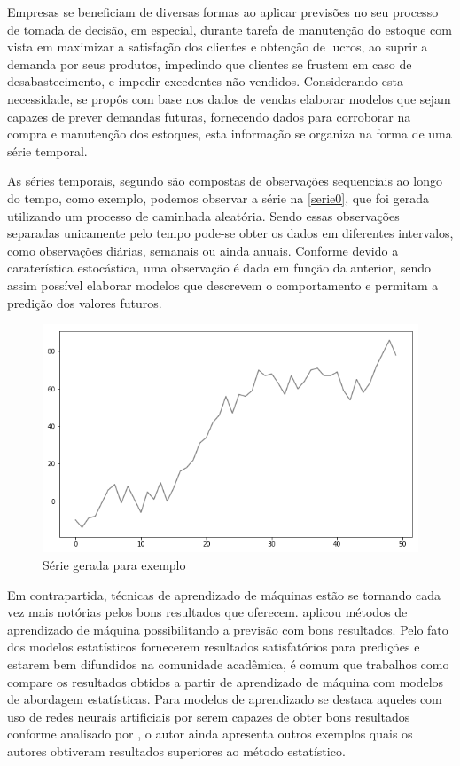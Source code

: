 \documentclass[
    12pt,
    oneside,
    a4paper,
    english,
    brazil
]{abntex2}
\begin{document}
Empresas se beneficiam de diversas formas ao aplicar previsões no seu processo
de tomada de decisão, em especial, durante tarefa de manutenção do estoque com
vista em maximizar a satisfação dos clientes e obtenção de lucros, ao suprir a
demanda por seus produtos, impedindo que clientes se frustem em caso de
desabastecimento, e impedir excedentes não vendidos. Considerando esta
necessidade, se propôs com base nos dados de vendas elaborar modelos que sejam
capazes de prever demandas futuras, fornecendo dados para corroborar na compra e
manutenção dos estoques, esta informação se organiza na forma de uma série
temporal.

As séries temporais, segundo  são compostas de observações
sequenciais ao longo do tempo, como exemplo, podemos observar a série na
\autoref{serie0}, que foi gerada utilizando um processo de caminhada aleatória.
Sendo essas observações separadas unicamente pelo tempo pode-se obter os dados
em diferentes intervalos, como observações diárias, semanais ou ainda anuais.
Conforme  devido a caraterística estocástica, uma observação
é dada em função da anterior, sendo assim possível elaborar modelos que
descrevem o comportamento e permitam a predição dos valores futuros.

\begin{figure}[ht]
    \centering
    \caption{Série gerada para exemplo}\label{serie0}
    \includegraphics[width=.6\linewidth]{images/serie_exemplo.png}
\end{figure}


Em contrapartida, técnicas de aprendizado de máquinas estão se tornando cada vez
mais notórias pelos bons resultados que oferecem.  aplicou
métodos de aprendizado de máquina possibilitando a previsão com bons resultados.
Pelo fato dos modelos estatísticos fornecerem resultados satisfatórios para
predições e estarem bem difundidos na comunidade acadêmica, é comum que
trabalhos como  compare os resultados obtidos a partir de
aprendizado de máquina com modelos de abordagem estatísticas. Para modelos de
aprendizado se destaca aqueles com uso de redes neurais artificiais por serem
capazes de obter bons resultados conforme analisado por , o
autor ainda apresenta outros exemplos quais os autores obtiveram resultados
superiores ao método estatístico.
\end{document}
